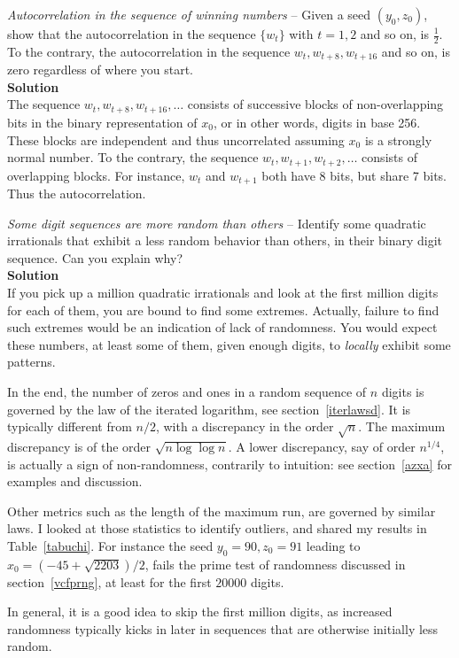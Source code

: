 \documentclass[oneside,10pt]{book}
\begin{document}
\begin{Exercise}\label{kn5es} {\em Autocorrelation in the sequence of winning numbers} -- Given a seed
 $(y_0,z_0)$, show that the autocorrelation in the sequence $\{w_t\}$ with $t=1,2$ and so on, is $\frac{1}{2}$.
To the contrary, the autocorrelation in the sequence $w_t, w_{t+8}, w_{t+16}$ and so on, is zero regardless of where you start. \vspace{1ex} \\
{\bf Solution} \\
   The sequence $w_t, w_{t+8}, w_{t+16},\dots$ consists of successive blocks of non-overlapping bits in the binary representation of $x_0$, or in other words, digits in base 256. These blocks are independent and thus uncorrelated assuming $x_0$ is a \textcolor{index}{strongly normal} number. To the contrary, the sequence $w_t, w_{t+1}, w_{t+2},\dots$ consists of overlapping
 blocks. For instance, $w_t$ and $w_{t+1}$ both have 8 bits, but share 7 bits. Thus the autocorrelation.
\end{Exercise}

\begin{Exercise}\label{kn5es} {\em Some digit sequences are more random than others} -- Identify some
 quadratic irrationals that exhibit
 a less random behavior than others, in their binary digit sequence. Can you explain why? \vspace{1ex} \\
{\bf Solution} \\
 If you pick up a million quadratic irrationals and look at the first million digits for each of them, you are bound to find some extremes. Actually, failure to find such extremes would be an indication of lack of randomness. You would expect these numbers, at least some of them, given enough digits, to {\em locally} exhibit some patterns.

In the end, the number of zeros and ones in a random sequence of $n$ digits is governed by the \textcolor{index}{law of the iterated logarithm}, see section~\ref{iterlawsd}. It is typically different from $n/2$, with a discrepancy
in the order $\sqrt{n}$. The maximum discrepancy is of the order $\sqrt{n\log\log n}$. A lower discrepancy, say of order $n^{1/4}$, is actually a sign of non-randomness, contrarily to intuition: see section~\ref{azxa} for examples and discussion.

Other metrics such as the length of the maximum run, are governed by similar laws.
 I looked at those statistics to identify outliers, and shared my results in Table~\ref{tabuchi}. For instance
 the seed $y_0=90, z_0=91$ leading to $x_0 = (-45 +\sqrt{2203})/2$, fails the
\textcolor{index}{prime test of randomness} discussed in section~\ref{vcfprng}, at least for the first $\num{20000}$ digits.

In general, it is a good idea to skip the first million digits, as increased randomness typically kicks in later in sequences that are otherwise initially less random.
\end{Exercise}
\end{document}
